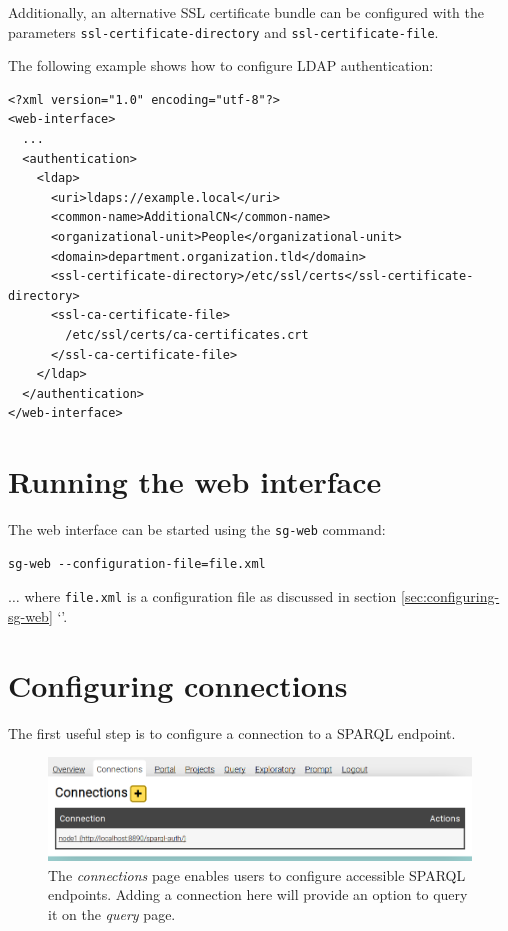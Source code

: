   \begin{sloppypar}
  Additionally, an alternative SSL certificate bundle can be configured with
  the parameters \texttt{ssl-certificate-directory} and
  \texttt{ssl-certificate-file}.
  \end{sloppypar}

  The following example shows how to configure LDAP authentication:

\begin{siderules}
\begin{verbatim}
<?xml version="1.0" encoding="utf-8"?>
<web-interface>
  ...
  <authentication>
    <ldap>
      <uri>ldaps://example.local</uri>
      <common-name>AdditionalCN</common-name>
      <organizational-unit>People</organizational-unit>
      <domain>department.organization.tld</domain>
      <ssl-certificate-directory>/etc/ssl/certs</ssl-certificate-directory>
      <ssl-ca-certificate-file>
        /etc/ssl/certs/ca-certificates.crt
      </ssl-ca-certificate-file>
    </ldap>
  </authentication>
</web-interface>
\end{verbatim}
\end{siderules}

\section{Running the web interface}

  The web interface can be started using the \texttt{sg-web} command:

\begin{siderules}
\begin{verbatim}
sg-web --configuration-file=file.xml
\end{verbatim}
\end{siderules}

  $\ldots{}$ where \texttt{file.xml} is a configuration file as
  discussed in section \ref{sec:configuring-sg-web}
  {\color{LinkGray}`'}.

\section{Configuring connections}
\label{sec:configure-connections}

  The first useful step is to configure a connection to a SPARQL endpoint.

  \begin{figure}[h]
    \begin{center}
      \includegraphics[width=1.0\textwidth]{figures/web-connections.png}
    \end{center}
    \caption{The \emph{connections} page enables users to configure accessible
      SPARQL endpoints.  Adding a connection here will provide an option to
      query it on the \emph{query} page.}
    \label{fig:web-connections}
  \end{figure}

